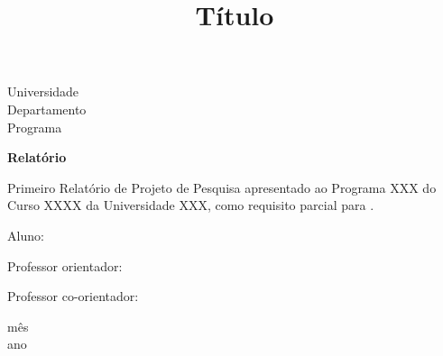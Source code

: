 \documentclass[a4paper, 12pt]{article}
\begin{document}
\begin{titlepage}
	\begin{center}
	

		\Huge{Universidade}\\
		\large{Departamento}\\ 
		\large{Programa}\\ 
\vspace{15pt}
        
        \vspace{85pt}
        
		\textbf{\LARGE{Relatório}}
		\title{\large{Título}}
			
	\end{center}
\vspace{1,5cm}
	
	\begin{flushright}

   \begin{list}{}{
      \setlength{\leftmargin}{4.5cm}
      \setlength{\rightmargin}{0cm}
      \setlength{\labelwidth}{0pt}
      \setlength{\labelsep}{\leftmargin}}

      \item Primeiro Relatório de Projeto de Pesquisa apresentado ao Programa XXX do Curso XXXX da Universidade XXX, como requisito parcial para .

      \begin{list}{}{
      \setlength{\leftmargin}{0cm}
      \setlength{\rightmargin}{0cm}
      \setlength{\labelwidth}{0pt}
      \setlength{\labelsep}{\leftmargin}}

			\item Aluno: \
            \item Professor orientador: \
      		\item Professor co-orientador: \

      \end{list}
   \end{list}
\end{flushright}
\vspace{1cm}
\begin{center}
		\vspace{\fill}
		 mês\\
		 ano
			\end{center}
\end{titlepage}
\newpage
\newpage
\tableofcontents
\thispagestyle{empty}
\end{document}
